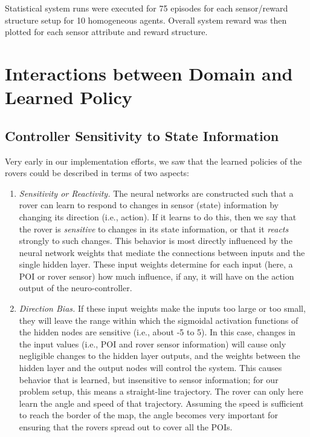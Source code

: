 \documentclass[letterpaper, 10 pt, conference]{ieeeconf}  %
\begin{document}
Statistical system runs were executed for 75 episodes for each
sensor/reward structure setup for 10 homogeneous agents.  Overall system reward was then plotted for each
sensor attribute and reward structure.


\section{Interactions between Domain and Learned Policy}
\subsection{Controller Sensitivity to State Information}
Very early in our implementation efforts, we saw that the learned policies of the rovers could be described in terms of two aspects:

\begin{enumerate}
\item \emph{Sensitivity or Reactivity.} The neural networks are constructed such that a rover can learn to respond to changes in sensor (state) information by changing its direction (i.e., action). If it learns to do this, then we say that the rover is \emph{sensitive} to changes in its state information, or that it \emph{reacts} strongly to such changes. This behavior is most directly influenced by the neural network weights that mediate the connections between inputs and the single hidden layer. These input weights determine for each input (here, a POI or rover sensor) how much influence, if any, it will have on the action output of the neuro-controller. 

\item \emph{Direction Bias.} If these input weights make the inputs too large or too small, they will leave the range within which the sigmoidal activation functions of the hidden nodes are sensitive (i.e., about -5 to 5). In this case, changes in the input values (i.e., POI and rover sensor information) will cause only negligible changes to the hidden layer outputs, and the weights between the hidden layer and the output nodes will control the system. This causes behavior that is learned, but insensitive to sensor information; for our problem setup, this means a straight-line trajectory. The rover can only here learn the angle and speed of that trajectory. Assuming the speed is sufficient to reach the border of the map, the angle becomes very important for ensuring that the rovers spread out to cover all the POIs. 
\end{enumerate}
\end{document}
